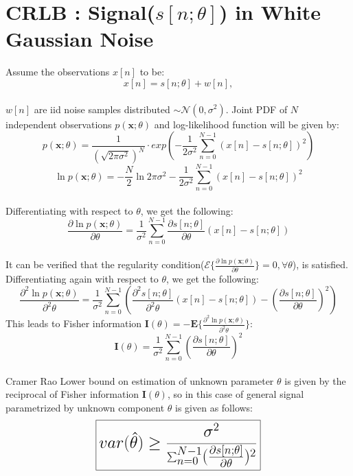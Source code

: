 \documentclass{article}
\begin{document}
\section{CRLB : Signal($s[n;\theta]$) in White Gaussian Noise}
Assume the observations $x[n]$ to be:
\\
$$x[n] = s[n;\theta] + w[n],$$
\\
$w[n]$ are iid noise samples distributed $\sim \mathcal{N}(0, \sigma^2)$. Joint PDF of $N$ independent observations $p(\mathbf x; \theta)$ and log-likelihood function will be given by:
\\
$$p(\mathbf x; \theta) = \frac{1}{(\sqrt{2\pi \sigma^2})^N} \cdot exp(-\frac{1}{2\sigma^2}\sum^{N-1}_{n=0}(x[n] - s[n;\theta])^2)$$
$$\ln{p(\mathbf x;\theta)} = -\frac{N}{2}\ln{2\pi \sigma^2} - \frac{1}{2\sigma^2}\sum^{N-1}_{n=0}(x[n] - s[n;\theta])^2$$
\\
Differentiating with respect to $\theta$, we get the following:
\\
$$\frac{\partial \ln{p(\mathbf x; \theta)}}{\partial \theta} = \frac{1}{\sigma^2}\sum^{N-1}_{n=0}\frac{\partial s[n;\theta]}{\partial \theta}(x[n] - s[n;\theta])$$
\\
It can be verified that the regularity condition($\mathcal{E}\{ \frac{\partial \ln{p(\mathbf x; \theta)}}{\partial \theta} \} = 0, \forall \theta$), is satisfied. Differentiating again with respect to $\theta$, we get the following:
$$\frac{\partial ^2 \ln{p(\mathbf x; \theta)}}{\partial ^2 \theta} = \frac{1}{\sigma^2}\sum^{N-1}_{n=0}(\frac{\partial ^2s[n;\theta]}{\partial ^2\theta}(x[n] - s[n;\theta]) - (\frac{\partial s[n;\theta]}{\partial \theta})^2)$$
This leads to Fisher information $\mathbf I (\theta) = -\mathbf E \{ \frac{\partial ^2\ln{p(\mathbf x; \theta)}}{\partial ^2\theta} \}$:
\\
$$\mathbf I(\theta) = \frac{1}{\sigma^2}\sum^{N-1}_{n=0}(\frac{\partial s[n;\theta]}{\partial \theta} )^2 $$
\\
Cramer Rao Lower bound on estimation of unknown parameter $\theta$ is given by the reciprocal of Fisher information $\mathbf{I}(\theta)$, so in this case of general signal parametrized by unknown component $\theta$ is given as follows:
\\
\begin{equation} \label{eqA}
\LARGE
\boxed {var(\hat{\theta}) \ge \frac{\sigma^2}{ \sum^{N-1}_{n=0} (\frac{\partial s[n;\theta]}{\partial \theta} )^2}}
\end{equation}

\newpage
\nocite{*}


\end{document}
